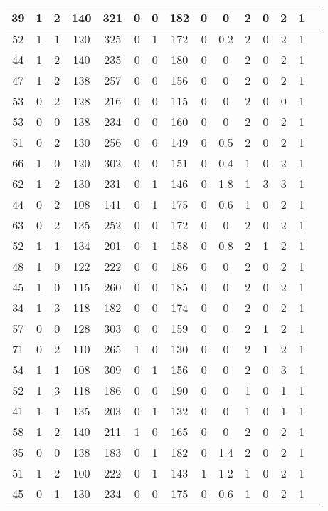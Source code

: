 \documentclass{article}
\begin{document}
\begin{longtable}{
|
c|c|c|c|c|c|c|c|c|c|c|c|c|c|c|}
\hline
39 & 1 & 2 & 140 & 321 & 0 & 0 & 182 & 0 & 0 & 2 & 0 & 2 & 1 \\
\hline
52 & 1 & 1 & 120 & 325 & 0 & 1 & 172 & 0 & 0.2 & 2 & 0 & 2 & 1 \\
\hline
44 & 1 & 2 & 140 & 235 & 0 & 0 & 180 & 0 & 0 & 2 & 0 & 2 & 1 \\
\hline
47 & 1 & 2 & 138 & 257 & 0 & 0 & 156 & 0 & 0 & 2 & 0 & 2 & 1 \\
\hline
53 & 0 & 2 & 128 & 216 & 0 & 0 & 115 & 0 & 0 & 2 & 0 & 0 & 1 \\
\hline
53 & 0 & 0 & 138 & 234 & 0 & 0 & 160 & 0 & 0 & 2 & 0 & 2 & 1 \\
\hline
51 & 0 & 2 & 130 & 256 & 0 & 0 & 149 & 0 & 0.5 & 2 & 0 & 2 & 1 \\
\hline
66 & 1 & 0 & 120 & 302 & 0 & 0 & 151 & 0 & 0.4 & 1 & 0 & 2 & 1 \\
\hline
62 & 1 & 2 & 130 & 231 & 0 & 1 & 146 & 0 & 1.8 & 1 & 3 & 3 & 1 \\
\hline
44 & 0 & 2 & 108 & 141 & 0 & 1 & 175 & 0 & 0.6 & 1 & 0 & 2 & 1 \\
\hline
63 & 0 & 2 & 135 & 252 & 0 & 0 & 172 & 0 & 0 & 2 & 0 & 2 & 1 \\
\hline
52 & 1 & 1 & 134 & 201 & 0 & 1 & 158 & 0 & 0.8 & 2 & 1 & 2 & 1 \\
\hline
48 & 1 & 0 & 122 & 222 & 0 & 0 & 186 & 0 & 0 & 2 & 0 & 2 & 1 \\
\hline
45 & 1 & 0 & 115 & 260 & 0 & 0 & 185 & 0 & 0 & 2 & 0 & 2 & 1 \\
\hline
34 & 1 & 3 & 118 & 182 & 0 & 0 & 174 & 0 & 0 & 2 & 0 & 2 & 1 \\
\hline
57 & 0 & 0 & 128 & 303 & 0 & 0 & 159 & 0 & 0 & 2 & 1 & 2 & 1 \\
\hline
71 & 0 & 2 & 110 & 265 & 1 & 0 & 130 & 0 & 0 & 2 & 1 & 2 & 1 \\
\hline
54 & 1 & 1 & 108 & 309 & 0 & 1 & 156 & 0 & 0 & 2 & 0 & 3 & 1 \\
\hline
52 & 1 & 3 & 118 & 186 & 0 & 0 & 190 & 0 & 0 & 1 & 0 & 1 & 1 \\
\hline
41 & 1 & 1 & 135 & 203 & 0 & 1 & 132 & 0 & 0 & 1 & 0 & 1 & 1 \\
\hline
58 & 1 & 2 & 140 & 211 & 1 & 0 & 165 & 0 & 0 & 2 & 0 & 2 & 1 \\
\hline
35 & 0 & 0 & 138 & 183 & 0 & 1 & 182 & 0 & 1.4 & 2 & 0 & 2 & 1 \\
\hline
51 & 1 & 2 & 100 & 222 & 0 & 1 & 143 & 1 & 1.2 & 1 & 0 & 2 & 1 \\
\hline
45 & 0 & 1 & 130 & 234 & 0 & 0 & 175 & 0 & 0.6 & 1 & 0 & 2 & 1 \\

\end{longtable}
\end{document}
